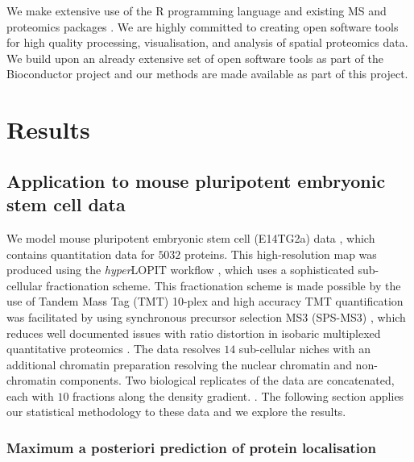 \documentclass[10pt,letterpaper]{article}\usepackage[]{graphicx}\usepackage[]{color}
\begin{document}
We make extensive use of the R programming language \cite{R} and
existing MS and proteomics packages \cite{MSnbase:2012,
  pRoloc:2014}. We are highly committed to creating open software
tools for high quality processing, visualisation, and analysis of
spatial proteomics data.  We build upon an already extensive set of
open software tools \cite{pRoloc:2014} as part of the Bioconductor
project \cite{Bioconductor::2004, Huber::2015} and our methods are
made available as part of this project.

\section*{Results}

\subsection*{Application to mouse pluripotent embryonic stem cell data}

We model mouse pluripotent embryonic stem cell (E14TG2a) data
\cite{hyper}, which contains quantitation data for $5032$
proteins. This high-resolution map was produced using the
\textit{hyper}LOPIT workflow \cite{Mulvey:2017}, which uses a
sophisticated sub-cellular fractionation scheme. This fractionation
scheme is made possible by the use of Tandem Mass Tag (TMT) 10-plex
and high accuracy TMT quantification was facilitated by using
synchronous precursor selection MS3 (SPS-MS3) \cite{Mcalister::2014},
which reduces well documented issues with ratio distortion in
isobaric multiplexed quantitative proteomics \cite{Ting:2011}. The
data resolves $14$ sub-cellular niches with an additional chromatin
preparation resolving the nuclear chromatin and non-chromatin
components. Two biological replicates of the data are concatenated,
each with $10$ fractions along the density gradient. {}. The following
section applies our statistical methodology to these data and we
explore the results.

\subsubsection*{Maximum a posteriori prediction of protein localisation}
\end{document}
